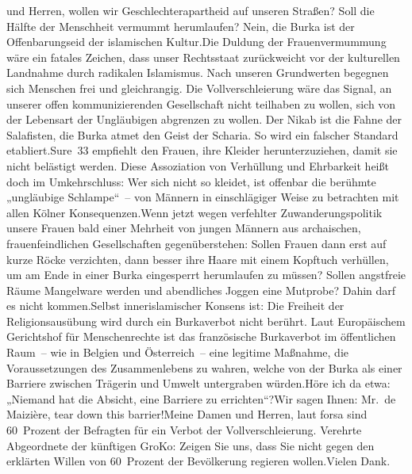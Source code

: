 \documentclass{article}
\begin{document}
und Herren, wollen wir Geschlechterapartheid auf unseren Straßen? Soll die Hälfte der Menschheit vermummt herumlaufen? Nein, die Burka ist der Offenbarungseid der islamischen Kultur.Die Duldung der Frauenvermummung wäre ein fatales Zeichen, dass unser Rechtsstaat zurückweicht vor der kulturellen Landnahme durch radikalen Islamismus. Nach unseren Grundwerten begegnen sich Menschen frei und gleichrangig. Die Vollverschleierung wäre das Signal, an unserer offen kommunizierenden Gesellschaft nicht teilhaben zu wollen, sich von der Lebensart der Ungläubigen abgrenzen zu wollen. Der Nikab ist die Fahne der Salafisten, die Burka atmet den Geist der Scharia. So wird ein falscher Standard etabliert.Sure 33 empfiehlt den Frauen, ihre Kleider herunterzuziehen, damit sie nicht belästigt werden. Diese Assoziation von Verhüllung und Ehrbarkeit heißt doch im Umkehrschluss: Wer sich nicht so kleidet, ist offenbar die berühmte „ungläubige Schlampe“ – von Männern in einschlägiger Weise zu betrachten mit allen Kölner Konsequenzen.Wenn jetzt wegen verfehlter Zuwanderungspolitik unsere Frauen bald einer Mehrheit von jungen Männern aus archaischen, frauenfeindlichen Gesellschaften gegenüberstehen: Sollen Frauen dann erst auf kurze Röcke verzichten, dann besser ihre Haare mit einem Kopftuch verhüllen, um am Ende in einer Burka eingesperrt herumlaufen zu müssen? Sollen angstfreie Räume Mangelware werden und abendliches Joggen eine Mutprobe? Dahin darf es nicht kommen.Selbst innerislamischer Konsens ist: Die Freiheit der Religionsausübung wird durch ein Burkaverbot nicht berührt. Laut Europäischem Gerichtshof für Menschenrechte ist das französische Burkaverbot im öffentlichen Raum – wie in Belgien und Österreich – eine legitime Maßnahme, die Voraussetzungen des Zusammenlebens zu wahren, welche von der Burka als einer Barriere zwischen Trägerin und Umwelt untergraben würden.Höre ich da etwa: „Niemand hat die Absicht, eine Barriere zu errichten“?Wir sagen Ihnen: Mr. de Maizière, tear down this barrier!Meine Damen und Herren, laut forsa sind 60 Prozent der Befragten für ein Verbot der Vollverschleierung. Verehrte Abgeordnete der künftigen GroKo: Zeigen Sie uns, dass Sie nicht gegen den erklärten Willen von 60 Prozent der Bevölkerung regieren wollen.Vielen Dank.
\end{document}
